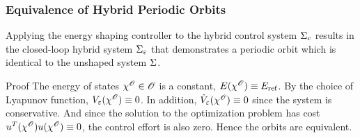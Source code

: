 \begin{frame}[t]
  \frametitle{Equivalence of Hybrid Periodic Orbits}
  \begin{lemma}
    Applying the energy shaping controller to the hybrid control system $\Sigma_{c}$
    results in the closed-loop hybrid system $\Sigma_{\varepsilon}$ that demonstrates a
    periodic orbit which is identical to the unshaped system $\Sigma$.
  \end{lemma}
  \begin{block}{Proof}
    The energy of states $\chi^{\mathscr O} \in \mathscr O$ is a constant,
    $E(\chi^{\mathscr O}) \equiv E_{\mathrm{ref}}$. By the choice of Lyapunov function,
    $V_{\varepsilon}(\chi^{\mathscr O}) \equiv 0$. In addition, ${\dot V}_{\varepsilon}(\chi^{\mathscr O}) \equiv 0$ since
    the system is conservative. And since the solution to the optimization
    problem has cost $u^{T}(\chi^{\mathscr O}) u(\chi^{\mathscr O}) \equiv 0$, the
    control effort is also zero. Hence the orbits are equivalent.
    \end{block}
\end{frame}

